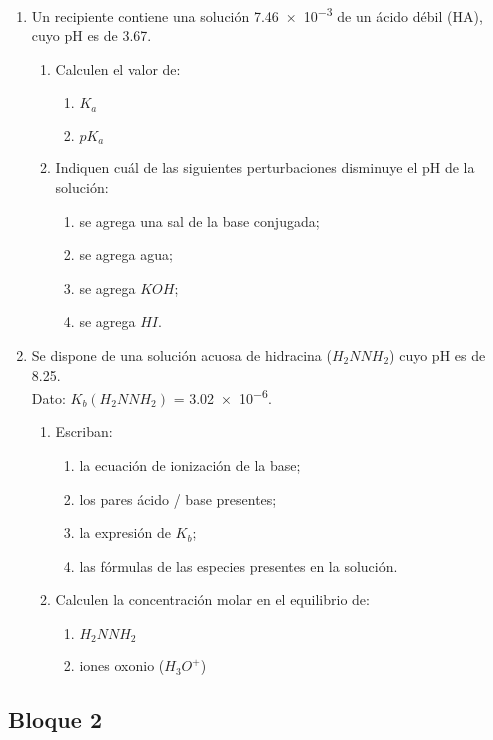 \documentclass[../practica.root.tex]{subfiles}
\begin{document}
\begin{enumerate}
    \item[10.] Un recipiente contiene una solución \SI{7,46e-3}{\MR} de un ácido débil (HA), cuyo pH es de \num{3,67}.
          \begin{enumerate}
              \item Calculen el valor de:
                    \begin{enumerate}
                        \item $K_a$
                        \item $pK_a$
                    \end{enumerate}
              \item Indiquen cuál de las siguientes perturbaciones disminuye el pH de la solución:
                    \begin{enumerate}
                        \item se agrega una sal de la base conjugada;
                        \item se agrega agua;
                        \item se agrega $KOH$;
                        \item se agrega $HI$.
                    \end{enumerate}
          \end{enumerate}

    \item Se dispone de una solución acuosa de hidracina ($H_2NNH_2$) cuyo pH es de \num{8,25}. \\
          Dato: $K_b(H_2NNH_2)$ = \num{3,02e-6}.
          \begin{enumerate}
              \item Escriban:
                    \begin{enumerate}
                        \item la ecuación de ionización de la base;
                        \item los pares ácido / base presentes;
                        \item la expresión de $K_b$;
                        \item las fórmulas de las especies presentes en la solución.
                    \end{enumerate}
              \item Calculen la concentración molar en el equilibrio de:
                    \begin{enumerate}
                        \item $H_2NNH_2$
                        \item iones oxonio ($H_3O^+$)
                    \end{enumerate}
          \end{enumerate}
\end{enumerate}
\subsection{Bloque 2}%
\end{document}

